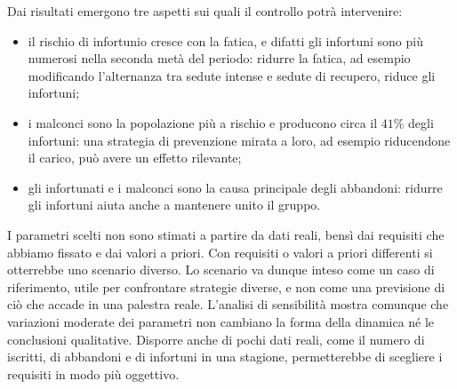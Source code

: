 Dai risultati emergono tre aspetti sui quali il controllo potrà intervenire:
\begin{itemize}
    \item il rischio di infortunio cresce con la fatica, e difatti gli infortuni sono più numerosi nella seconda metà del periodo: ridurre la fatica, ad esempio modificando l'alternanza tra sedute intense e sedute di recupero, riduce gli infortuni;
    \item i malconci sono la popolazione più a rischio e producono circa il $41\%$ degli infortuni: una strategia di prevenzione mirata a loro, ad esempio riducendone il carico, può avere un effetto rilevante;
    \item gli infortunati e i malconci sono la causa principale degli abbandoni: ridurre gli infortuni aiuta anche a mantenere unito il gruppo.
\end{itemize}

I parametri scelti non sono stimati a partire da dati reali, bensì dai requisiti che abbiamo fissato e dai valori a priori. Con requisiti o valori a priori differenti si otterrebbe uno scenario diverso. Lo scenario va dunque inteso come un caso di riferimento, utile per confrontare strategie diverse, e non come una previsione di ciò che accade in una palestra reale. L'analisi di sensibilità mostra comunque che variazioni moderate dei parametri non cambiano la forma della dinamica né le conclusioni qualitative. Disporre anche di pochi dati reali, come il numero di iscritti, di abbandoni e di infortuni in una stagione, permetterebbe di scegliere i requisiti in modo più oggettivo.

